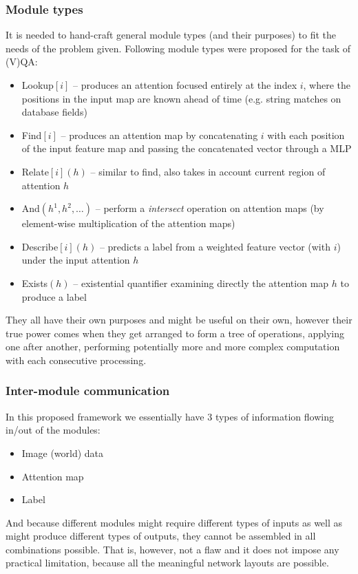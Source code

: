 \documentclass[a4paper,twocolumn]{article}
\begin{document}
\subsubsection*{Module types}
It is needed to hand-craft general module types (and their purposes) to fit the needs of the problem given. Following module types were proposed for the task of (V)QA:
    \begin{itemize}
        \item Lookup$[i]$ – produces an attention focused entirely at the index $i$, where the positions in the input map are known ahead of time (e.g. string matches on database fields)
        \item Find$[i]$ – produces an attention map by concatenating $i$ with each position of the input feature map and passing the concatenated vector through a MLP
        \item Relate$[i](h)$ – similar to find, also takes in account current region of attention $h$
        \item And$(h^1, h^2, \dots)$ – perform a \textit{intersect} operation on attention maps (by element-wise multiplication of the attention maps)
        \item Describe$[i](h)$ – predicts a label from a weighted feature vector (with $i$) under the input attention $h$
        \item Exists$(h)$ – existential quantifier examining directly the attention map $h$ to produce a label
    \end{itemize}
They all have their own purposes and might be useful on their own, however their true
power comes when they get arranged to form a tree of operations, applying one after another, performing potentially more and more complex computation with each consecutive processing.

\subsubsection*{Inter-module communication}
In this proposed framework we essentially have 3 types of information flowing in/out of the modules:
    \begin{itemize}
        \item Image (world) data
        \item Attention map
        \item Label
    \end{itemize}
And because different modules might require different types of inputs as well as might produce different types of outputs, they cannot be assembled in all combinations possible. That is, however, not a flaw and it does not impose any practical limitation, because all the meaningful network layouts are possible.
\end{document}
